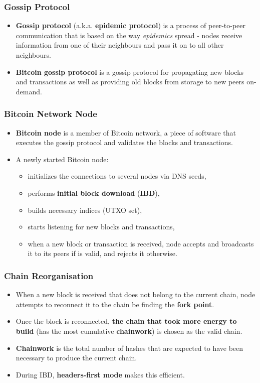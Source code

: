 \documentclass{beamer}
\begin{document}
\begin{frame}
  \frametitle{Gossip Protocol}
  \begin{itemize}
  \item \textbf{Gossip protocol} (a.k.a. \textbf{epidemic protocol}) is a
    process of peer-to-peer communication that is based on the way
    \textit{epidemics} spread - nodes receive information from one of their
    neighbours and pass it on to all other neighbours.
  \item \textbf{Bitcoin gossip protocol} is a gossip protocol for propagating
    new blocks and transactions as well as providing old blocks from storage to
    new peers on-demand.
  \end{itemize}
  \begin{center}
  \end{center}
\end{frame}

\begin{frame}
  \frametitle{Bitcoin Network Node}
  \begin{itemize}
  \item \textbf{Bitcoin node} is a member of Bitcoin network, a piece of
    software that executes the gossip protocol and validates the blocks and
    transactions.
  \item A newly started Bitcoin node:
    \begin{itemize}
    \item initializes the connections to several nodes via DNS seeds,
    \item performs \textbf{initial block download} (\textbf{IBD}),
    \item builds necessary indices (UTXO set),
    \item starts listening for new blocks and transactions,
    \item when a new block or transaction is received, node accepts and
      broadcasts it to its peers if is valid, and rejects it otherwise.
    \end{itemize}
  \end{itemize}
\end{frame}

\begin{frame}
  \frametitle{Chain Reorganisation}
  \begin{itemize}
  \item When a new block is received that does not belong to the current chain,
    node attempts to reconnect it to the chain be finding the \textbf{fork
      point}.
  \item Once the block is reconnected, \textbf{the chain that took more energy
      to build} (has the most cumulative \textbf{chainwork}) is chosen as the
    valid chain.
  \item \textbf{Chainwork} is the total number of hashes that are expected to
    have been necessary to produce the current chain.
  \item During IBD, \textbf{headers-first mode} makes this efficient.
  \end{itemize}
\end{frame}
\end{document}
